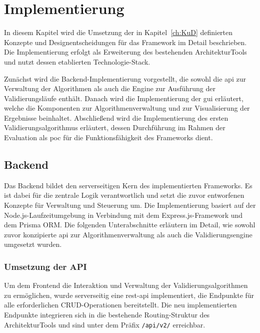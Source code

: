 

\chapter{Implementierung}
\label{ch:imp}

In diesem Kapitel wird die Umsetzung der in Kapitel~\ref{ch:KuD} definierten Konzepte und Designentscheidungen für das Framework im Detail beschrieben. Die Implementierung erfolgt als Erweiterung des bestehenden ArchitekturTools und nutzt dessen etablierten Technologie-Stack.

Zunächst wird die Backend-Implementierung vorgestellt, die sowohl die \gls{api} zur Verwaltung der Algorithmen als auch die Engine zur Ausführung der Validierungsläufe enthält. Danach wird die Implementierung der \gls{gui} erläutert, welche die Komponenten zur Algorithmenverwaltung und zur Visualisierung der Ergebnisse beinhaltet. Abschließend wird die Implementierung des ersten Validierungsalgorithmus erläutert, dessen Durchführung im Rahmen der Evaluation als \gls{poc} für die Funktionsfähigkeit des Frameworks dient.

\section{Backend}
\label{sec:backendimp}

Das Backend bildet den serverseitigen Kern des implementierten Frameworks. Es ist dabei für die zentrale Logik verantwortlich und setzt die zuvor entworfenen Konzepte für  Verwaltung und Steuerung um. Die Implementierung basiert auf der Node.js-Laufzeitumgebung in Verbindung mit dem Express.js-Framework und dem Prisma ORM. Die folgenden Unterabschnitte erläutern im Detail, wie sowohl zuvor konzipierte \gls{api} zur Algorithmenverwaltung als auch die Validierungsengine umgesetzt wurden.

\subsection{Umsetzung der API}
\label{subsec:api}

Um dem Frontend die Interaktion und Verwaltung der Validierungsalgorithmen zu ermöglichen, wurde serverseitig eine \gls{rest}-\gls{api} implementiert, die Endpunkte für alle erforderlichen CRUD-Operationen bereitstellt. Die neu implementierten Endpunkte integrieren sich in die bestehende Routing-Struktur des ArchitekturTools und sind unter dem Präfix \texttt{/api/v2/} erreichbar.

